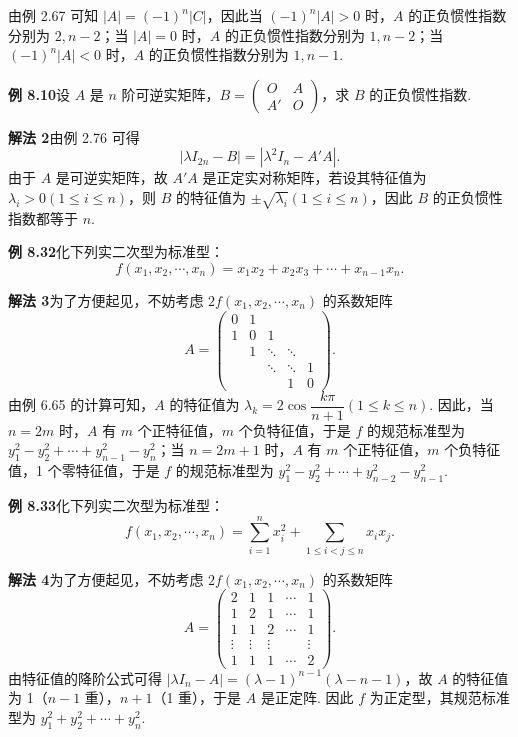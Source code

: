 \documentclass[UTF8,12pt,a4paper,fontset=fandol]{ctexart}
\begin{document}
由例 2.67 可知 $|A|=(-1)^n|C|$，因此当 $(-1)^n|A|>0$ 时，$A$ 的正负惯性指数分别为 $2,n-2$；当 $|A|=0$ 时，$A$ 的正负惯性指数分别为 $1,n-2$；当 $(-1)^n|A|<0$ 时，$A$ 的正负惯性指数分别为 $1,n-1$.

\noindent\textbf{例 8.10}\quad 设 $A$ 是 $n$ 阶可逆实矩阵，$B=\begin{pmatrix}O&A\\ A'&O\end{pmatrix}$，求 $B$ 的正负惯性指数.

\noindent\textbf{解法 2}\quad 由例 2.76 可得
\[
|\lambda I_{2n}-B|=|\lambda^2I_n-A'A|.
\]
由于 $A$ 是可逆实矩阵，故 $A'A$ 是正定实对称矩阵，若设其特征值为 $\lambda_i>0(1\le i\le n)$，则 $B$ 的特征值为 $\pm\sqrt{\lambda_i}(1\le i\le n)$，因此 $B$ 的正负惯性指数都等于 $n$.

\noindent\textbf{例 8.32}\quad 化下列实二次型为标准型：
\[
f(x_1,x_2,\cdots,x_n)=x_1x_2+x_2x_3+\cdots+x_{n-1}x_n.
\]

\noindent\textbf{解法 3}\quad 为了方便起见，不妨考虑 $2f(x_1,x_2,\cdots,x_n)$ 的系数矩阵
\[
A=\begin{pmatrix}
0&1&&&\\
1&0&1&&\\
&1&\ddots&\ddots&\\
&&\ddots&\ddots&1\\
&&&1&0
\end{pmatrix}.
\]
由例 6.65 的计算可知，$A$ 的特征值为 $\lambda_k=2\cos\dfrac{k\pi}{n+1}(1\le k\le n)$. 因此，当 $n=2m$ 时，$A$ 有 $m$ 个正特征值，$m$ 个负特征值，于是 $f$ 的规范标准型为 $y_1^2-y_2^2+\cdots+y_{n-1}^2-y_n^2$；当 $n=2m+1$ 时，$A$ 有 $m$ 个正特征值，$m$ 个负特征值，1 个零特征值，于是 $f$ 的规范标准型为 $y_1^2-y_2^2+\cdots+y_{n-2}^2-y_{n-1}^2$.

\noindent\textbf{例 8.33}\quad 化下列实二次型为标准型：
\[
f(x_1,x_2,\cdots,x_n)=\sum_{i=1}^nx_i^2+\sum_{1\le i<j\le n}x_ix_j.
\]

\noindent\textbf{解法 4}\quad 为了方便起见，不妨考虑 $2f(x_1,x_2,\cdots,x_n)$ 的系数矩阵
\[
A=\begin{pmatrix}
2&1&1&\cdots&1\\
1&2&1&\cdots&1\\
1&1&2&\cdots&1\\
\vdots&\vdots&\vdots&&\vdots\\
1&1&1&\cdots&2
\end{pmatrix}.
\]
由特征值的降阶公式可得 $|\lambda I_n-A|=(\lambda-1)^{n-1}(\lambda-n-1)$，故 $A$ 的特征值为 1（$n-1$ 重），$n+1$（1 重），于是 $A$ 是正定阵. 因此 $f$ 为正定型，其规范标准型为 $y_1^2+y_2^2+\cdots+y_n^2$.
\end{document}
